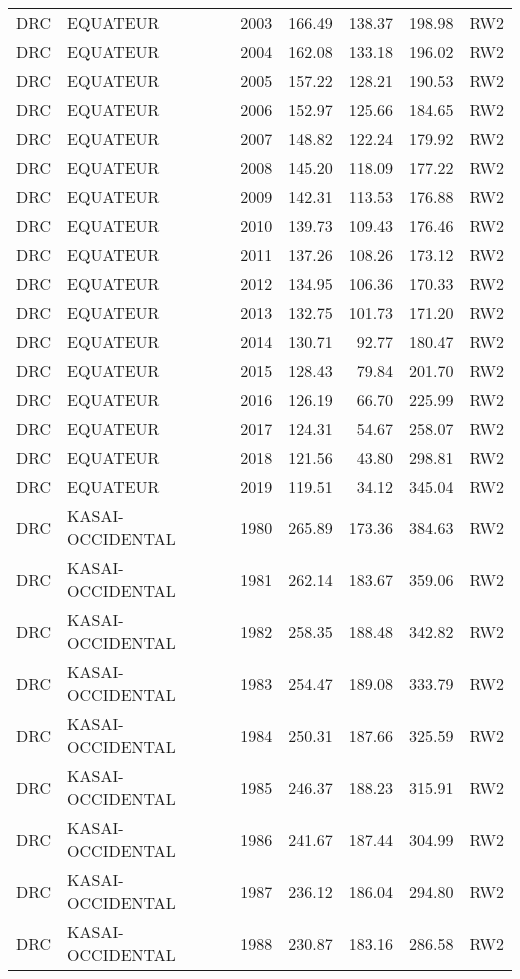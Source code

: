 \begin{longtable}{lllrrrl}
  DRC & EQUATEUR & 2003 & 166.49 & 138.37 & 198.98 & RW2 \\ 
  DRC & EQUATEUR & 2004 & 162.08 & 133.18 & 196.02 & RW2 \\ 
  DRC & EQUATEUR & 2005 & 157.22 & 128.21 & 190.53 & RW2 \\ 
  DRC & EQUATEUR & 2006 & 152.97 & 125.66 & 184.65 & RW2 \\ 
  DRC & EQUATEUR & 2007 & 148.82 & 122.24 & 179.92 & RW2 \\ 
  DRC & EQUATEUR & 2008 & 145.20 & 118.09 & 177.22 & RW2 \\ 
  DRC & EQUATEUR & 2009 & 142.31 & 113.53 & 176.88 & RW2 \\ 
  DRC & EQUATEUR & 2010 & 139.73 & 109.43 & 176.46 & RW2 \\ 
  DRC & EQUATEUR & 2011 & 137.26 & 108.26 & 173.12 & RW2 \\ 
  DRC & EQUATEUR & 2012 & 134.95 & 106.36 & 170.33 & RW2 \\ 
  DRC & EQUATEUR & 2013 & 132.75 & 101.73 & 171.20 & RW2 \\ 
  DRC & EQUATEUR & 2014 & 130.71 & 92.77 & 180.47 & RW2 \\ 
  DRC & EQUATEUR & 2015 & 128.43 & 79.84 & 201.70 & RW2 \\ 
  DRC & EQUATEUR & 2016 & 126.19 & 66.70 & 225.99 & RW2 \\ 
  DRC & EQUATEUR & 2017 & 124.31 & 54.67 & 258.07 & RW2 \\ 
  DRC & EQUATEUR & 2018 & 121.56 & 43.80 & 298.81 & RW2 \\ 
  DRC & EQUATEUR & 2019 & 119.51 & 34.12 & 345.04 & RW2 \\ 
  DRC & KASAI-OCCIDENTAL & 1980 & 265.89 & 173.36 & 384.63 & RW2 \\ 
  DRC & KASAI-OCCIDENTAL & 1981 & 262.14 & 183.67 & 359.06 & RW2 \\ 
  DRC & KASAI-OCCIDENTAL & 1982 & 258.35 & 188.48 & 342.82 & RW2 \\ 
  DRC & KASAI-OCCIDENTAL & 1983 & 254.47 & 189.08 & 333.79 & RW2 \\ 
  DRC & KASAI-OCCIDENTAL & 1984 & 250.31 & 187.66 & 325.59 & RW2 \\ 
  DRC & KASAI-OCCIDENTAL & 1985 & 246.37 & 188.23 & 315.91 & RW2 \\ 
  DRC & KASAI-OCCIDENTAL & 1986 & 241.67 & 187.44 & 304.99 & RW2 \\ 
  DRC & KASAI-OCCIDENTAL & 1987 & 236.12 & 186.04 & 294.80 & RW2 \\ 
  DRC & KASAI-OCCIDENTAL & 1988 & 230.87 & 183.16 & 286.58 & RW2 \\ 

\end{longtable}
